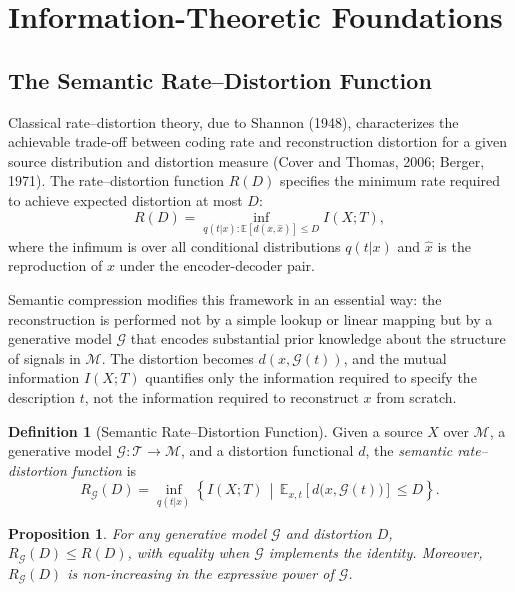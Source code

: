 \documentclass[11pt,a4paper]{article}
\newtheorem{proposition}[theorem]{Proposition}
\theoremstyle{definition}
\newtheorem{definition}[theorem]{Definition}
\theoremstyle{remark}
\begin{document}
\section{Information-Theoretic Foundations}
\label{sec:infotheory}

\subsection{The Semantic Rate--Distortion Function}

Classical rate--distortion theory, due to Shannon (1948), characterizes the achievable trade-off between coding rate and reconstruction distortion for a given source distribution and distortion measure (Cover and Thomas, 2006; Berger, 1971). The rate--distortion function $R(D)$ specifies the minimum rate required to achieve expected distortion at most $D$:
\[
R(D) = \inf_{q(t|x) : \mathbb{E}[d(x,\hat{x})] \le D} I(X; T),
\]
where the infimum is over all conditional distributions $q(t|x)$ and $\hat{x}$ is the reproduction of $x$ under the encoder-decoder pair.

Semantic compression modifies this framework in an essential way: the reconstruction is performed not by a simple lookup or linear mapping but by a generative model $\mathcal{G}$ that encodes substantial prior knowledge about the structure of signals in $\mathcal{M}$. The distortion becomes $d(x, \mathcal{G}(t))$, and the mutual information $I(X; T)$ quantifies only the information required to specify the description $t$, not the information required to reconstruct $x$ from scratch.

\begin{definition}[Semantic Rate--Distortion Function]
Given a source $X$ over $\mathcal{M}$, a generative model $\mathcal{G} : \mathcal{T} \rightarrow \mathcal{M}$, and a distortion functional $d$, the \emph{semantic rate--distortion function} is
\[
R_{\mathcal{G}}(D) = \inf_{q(t|x)} \left\{ I(X; T) \,\middle|\, \mathbb{E}_{x, t}\left[d\big(x, \mathcal{G}(t)\big)\right] \le D \right\}.
\]
\end{definition}

\begin{proposition}
For any generative model $\mathcal{G}$ and distortion $D$, $R_{\mathcal{G}}(D) \le R(D)$, with equality when $\mathcal{G}$ implements the identity. Moreover, $R_{\mathcal{G}}(D)$ is non-increasing in the expressive power of $\mathcal{G}$.
\end{proposition}
\end{document}
